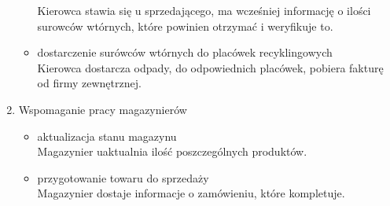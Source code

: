 \begin{enumerate}
\begin{itemize}
		Kierowca stawia się u sprzedającego, ma wcześniej informację o ilości surowców wtórnych, które powinien otrzymać i weryfikuje to.
		\item dostarczenie surówców wtórnych do placówek recyklingowych \\ 
		Kierowca dostarcza odpady, do odpowiednich placówek, pobiera fakturę od firmy zewnętrznej.
		\end{itemize}
	\item Wspomaganie pracy magazynierów
		\begin{itemize}
		\item aktualizacja stanu magazynu \\
	 	Magazynier uaktualnia ilość poszczególnych produktów.
	 	\item przygotowanie towaru do sprzedaży \\ 
	 	Magazynier dostaje informacje o zamówieniu, które kompletuje.
		\end{itemize}
\end{enumerate}